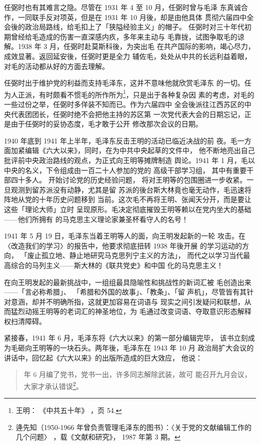 任弼时也有其难言之隐。尽管在 1931 年 4 至 10 月，任弼时曾与毛泽
东真诚合作，一同联手反对项英，但是在 1931 年 10 月後，却是由他具体
贯彻六届四中全会後的政治局路线，给毛扣上了「狭隘经验主义」的帽子。
任弼时对三十年代初期曾经给毛造成的伤害一直深感内疚，多年来主动与
毛靠拢，试图争取毛的谅解。1938 年 3 月，任弼时赴莫斯科後，为突出毛
在共产国际的影响，竭心尽力，成效显著。返回延安後，任弼时更是全力
辅佐毛，处处从中共的长远利益着眼，对毛的活动都从好的方面去理解。
 
任弼时出于维护党的利益而支持毛泽东，这并不意味他就欣赏毛泽东
的一切。任为人正派，有时颇看不惯毛的所作所为\footnote{王明：
《中共五十年》
，页 54.}，只是出于各种复杂因
素的考虑，对毛的一些过份之举，任弼时多佯装不知而已。作为六届四中
全会後派往江西苏区的中央代表团团长，任弼时绝不会把他主持的苏区第
一次党代表大会的日期忘记，正是由于任弼时的妥协态度，毛才敢于公开
修改那次会议的日期。
 
1940 年底到 1941 年上半年，毛泽东反击王明的活动已临近决战的前
夜。毛一方面加紧编辑《六大以来》，同时，在为中共中央起草的文件中，
他不断地亮出自己批评前中央政治路线的观点，为正式向王明等摊牌制造
舆论。1941 年 1 月，毛以中央的名义，下令组成由一百二十人参加的党的
高级干部学习组，
其中有重要干部四十多人。
开始讨论党的历史经验问题，
将对王明等的包围圈进一步收紧。一旦观测到留苏派没有动静，尤其是留
苏派的後台斯大林竟也毫无动作，毛迅速将阵地从党的十年历史问题移到
当前。这次毛不再将王明、张闻天分开，而是要让这些「理论大师」立时
呈现原形。毛决定彻底摧毁王明等赖以在党内坐大的基础——他们所拥有
的马克思主义理论家兼圣杯看守人的名号！
 
1941 年 5 月 19 日，毛泽东当着王明等人的面，向王明发起新的一轮
攻击。在〈改造我们的学习〉的报告中，他要求彻底扭转 1938 年後开展
的学习运动的方向，
「废止孤立地、静止地研究马克思列宁主义的方法」，
而代之以学习当代最高综合的马列主义——斯大林的《联共党史》和中国
化的马克思主义！
 
在向王明发起的最新挑战中，一组组最具隐喻性和挑战性的新词汇被
毛创造出来——「言必称希腊」、
「希腊和外国的故事」、「教条」、「留
声机」，尽管皆有其针对意涵，却并不明确所指，这就更加容易在词语与
现实之间引发疑问和联想，从而猛烈动摇王明等的老词汇的神圣地位，为
毛通过改变词语、夺取意识形态解释权扫清障碍。
 
紧接春，1941 年 6 月，毛泽东将《六大以来》的第一部分编辑完毕，
该书立刻成为毛砸向王明等的一块石头。两年後，毛泽东在 1943 年 10 月
政治局扩大会议的讲话中，回忆起《六大以来》的出版所造成的巨大效应，
他说：
\begin{quote}
	 年 6 月编了党书，党书一出，许多同志解除武装，故可
	能召开九月会议，大家才承认错误\footnote{逄先知（1950-1966 年曾负责管理毛泽东的图书）：〈关于党的文献编辑工作的几个问题〉
，载《文献和研究》， 1987 年第 3 期。}。
\end{quote}

